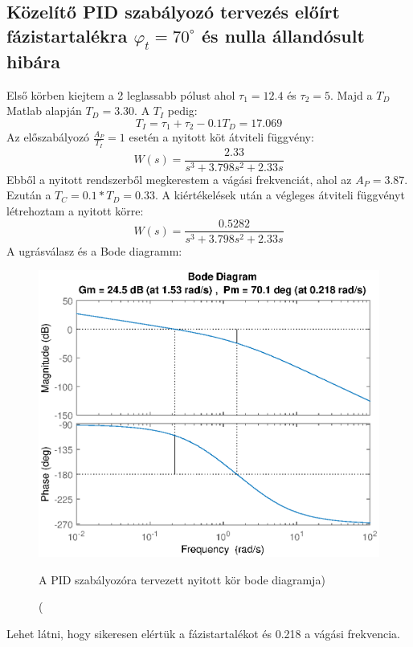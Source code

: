 \documentclass[12pt]{article}
\begin{document}
\subsection{Közelítő PID szabályozó tervezés előírt fázistartalékra $\varphi_t=70^\circ$ és nulla állandósult hibára}
Első körben kiejtem a 2 leglassabb pólust ahol $\tau_1=12.4$ és $\tau_2=5$. Majd a $T_D$ Matlab alapján $T_D=3.30$. A $T_I$ pedig:
\[T_I=\tau_1+\tau_2-0.1T_D=17.069\]
Az előszabályozó $\frac{A_P}{T_I}=1$ esetén a nyitott köt átviteli függvény:
\[W(s)=\frac{2.33}{s^3+3.798s^2+2.33s}\]
Ebből a nyitott rendszerből megkerestem a vágási frekvenciát, ahol az $A_P=3.87$. Ezután a  $T_C=0.1*T_D=0.33$. A kiértékelések után a végleges átviteli függvényt létrehoztam a nyitott körre:
\[W(s)=\frac{0.5282}{s^3+3.798s^2+2.33s}\]
A ugrásválasz és a Bode diagramm:
\begin{figure}[H]
\centering
\includegraphics[scale=.70]{WOPID}
\caption(A PID szabályozóra tervezett nyitott kör bode diagramja)
\end{figure}
Lehet látni, hogy sikeresen elértük a fázistartalékot és 0.218 a vágási frekvencia.
\end{document}

